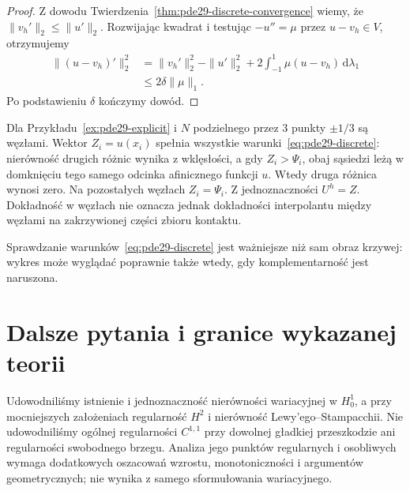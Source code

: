 \begin{proof}
Z dowodu Twierdzenia~\ref{thm:pde29-discrete-convergence}
wiemy, że $\|v_h'\|_2\le\|u'\|_2$.
Rozwijając kwadrat i testując $-u''=\mu$
przez $u-v_h\in V$, otrzymujemy
\[
 \begin{aligned}
 \|(u-v_h)'\|_2^2
 &=\|v_h'\|_2^2-\|u'\|_2^2
   +2\int_{-1}^1\mu(u-v_h)\,\mathrm d\lambda_1\\
 &\le2\delta\|\mu\|_1.
 \end{aligned}
\]
Po podstawieniu $\delta$ kończymy dowód.
\end{proof}

\begin{uwaga}
Dla Przykładu~\ref{ex:pde29-explicit} i $N$
podzielnego przez $3$ punkty $\pm1/3$ są węzłami.
Wektor $Z_i=u(x_i)$ spełnia wszystkie
warunki~\eqref{eq:pde29-discrete}: nierówność
drugich różnic wynika z wklęsłości, a gdy
$Z_i>\Psi_i$, obaj sąsiedzi leżą w domknięciu
tego samego odcinka afinicznego funkcji $u$.
Wtedy druga różnica wynosi zero.
Na pozostałych węzłach $Z_i=\Psi_i$.
Z jednoznaczności $U^h=Z$.
Dokładność w węzłach nie oznacza jednak
dokładności interpolantu między węzłami
na zakrzywionej części zbioru kontaktu.
\end{uwaga}

Sprawdzanie warunków~\eqref{eq:pde29-discrete}
jest ważniejsze niż sam obraz krzywej:
wykres może wyglądać poprawnie także wtedy,
gdy komplementarność jest naruszona.

\section{Dalsze pytania i granice wykazanej teorii}
Udowodniliśmy istnienie i jednoznaczność nierówności
wariacyjnej w $H_0^1$, a przy mocniejszych założeniach
regularność $H^2$ i nierówność Lewy'ego--Stampacchii.
Nie udowodniliśmy ogólnej regularności $C^{1,1}$
przy dowolnej gładkiej przeszkodzie ani regularności
swobodnego brzegu. Analiza jego punktów regularnych
i osobliwych wymaga dodatkowych oszacowań wzrostu,
monotoniczności i argumentów geometrycznych;
nie wynika z samego sformułowania wariacyjnego.


